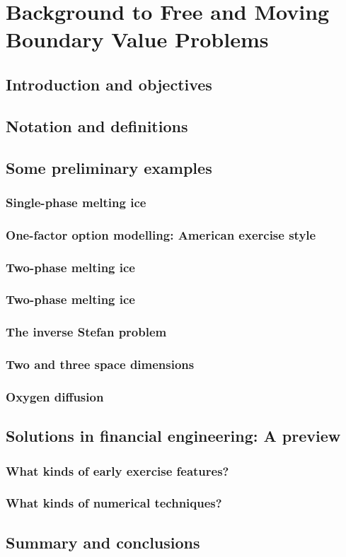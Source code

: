 \chapter{Background to Free and Moving Boundary Value Problems}

\section{Introduction and objectives}

\section{Notation and definitions}

\section{Some preliminary examples}

\subsection{Single-phase melting ice}

\subsection{One-factor option modelling: American exercise style}

\subsection{Two-phase melting ice}

\subsection{Two-phase melting ice}

\subsection{The inverse Stefan problem}

\subsection{Two and three space dimensions}

\subsection{Oxygen diffusion}

\section{Solutions in financial engineering: A preview}

\subsection{What kinds of early exercise features?}

\subsection{What kinds of numerical techniques?}

\section{Summary and conclusions}
